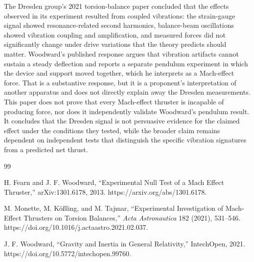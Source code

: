 \documentclass[11pt]{article}
\begin{document}
The Dresden group's 2021 torsion-balance paper concluded that the effects observed in its experiment resulted from coupled vibrations: the strain-gauge signal showed resonance-related second harmonics, balance-beam oscillations showed vibration coupling and amplification, and measured forces did not significantly change under drive variations that the theory predicts should matter. Woodward's published response argues that vibration artifacts cannot sustain a steady deflection and reports a separate pendulum experiment in which the device and support moved together, which he interprets as a Mach-effect force. That is a substantive response, but it is a proponent's interpretation of another apparatus and does not directly explain away the Dresden measurements. This paper does not prove that every Mach-effect thruster is incapable of producing force, nor does it independently validate Woodward's pendulum result. It concludes that the Dresden signal is not persuasive evidence for the claimed effect under the conditions they tested, while the broader claim remains dependent on independent tests that distinguish the specific vibration signatures from a predicted net thrust.

\begin{thebibliography}{99}

 H. Fearn and J. F. Woodward, ``Experimental Null Test of a Mach Effect Thruster,'' arXiv:1301.6178, 2013. https://arxiv.org/abs/1301.6178.

 M. Monette, M. K\"o{\ss}ling, and M. Tajmar, ``Experimental Investigation of Mach-Effect Thrusters on Torsion Balances,'' \emph{Acta Astronautica} 182 (2021), 531--546. https://doi.org/10.1016/j.actaastro.2021.02.037.

 J. F. Woodward, ``Gravity and Inertia in General Relativity,'' IntechOpen, 2021. https://doi.org/10.5772/intechopen.99760.

\end{thebibliography}
\end{document}
